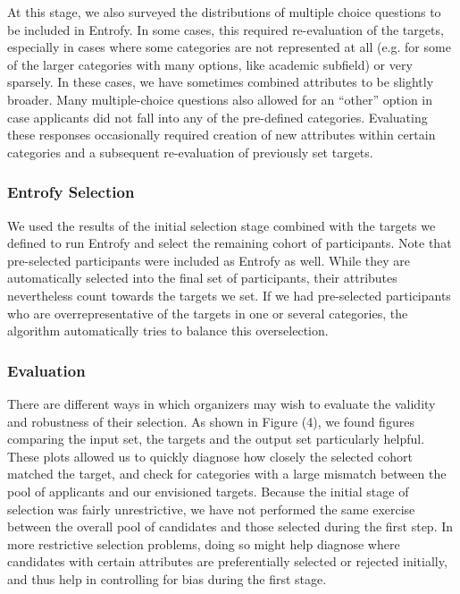 \documentclass[12pt]{article}
\begin{document}
At this stage, we also surveyed the distributions of multiple choice questions to be included in Entrofy. In some cases, this required re-evaluation of the targets, especially in cases where some categories are not represented at all (e.g. for some of the larger categories with many options, like academic subfield) or very sparsely. In these cases, we have sometimes combined attributes to be slightly broader. Many multiple-choice questions also allowed for an ``other'' option in case applicants did not fall into any of the pre-defined categories. Evaluating these responses occasionally required creation of new attributes within certain categories and a subsequent re-evaluation of previously set targets.

\subsubsection*{Entrofy Selection}

We used the results of the initial selection stage combined with the targets we defined to run Entrofy and select the remaining cohort of participants. Note that pre-selected participants were included as Entrofy as well. While they are automatically selected into the final set of participants, their attributes nevertheless count towards the targets we set. If we had pre-selected participants who are overrepresentative of the targets in one or several categories, the algorithm automatically tries to balance this overselection. 

\subsubsection*{Evaluation}

There are different ways in which organizers may wish to evaluate the validity and robustness of their selection. As shown in Figure (4), we found figures comparing the input set, the targets and the output set particularly helpful. These plots allowed us to quickly diagnose how closely the selected cohort matched the target, and check for categories with a large mismatch between the pool of applicants and our envisioned targets. Because the initial stage of selection was fairly unrestrictive, we have not performed the same exercise between the overall pool of candidates and those selected during the first step. In more restrictive selection problems, doing so might help diagnose where candidates with certain attributes are preferentially selected or rejected initially, and thus help in controlling for bias during the first stage.
\end{document}
